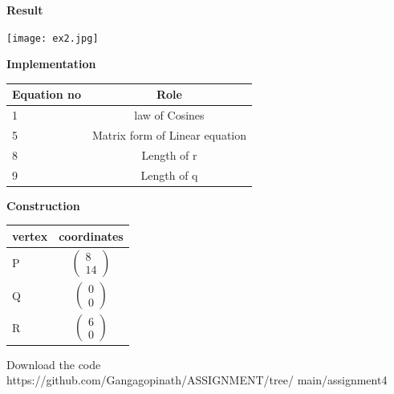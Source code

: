 \documentclass[10pt,a4paper]{article}
\begin{document}
\begin{multicols}{2}
{\textbf{Result} 
\begin{center}
	\texttt{[image: ex2.jpg]}
\end{center}\vspace{5mm}
\newpage
\vspace{4mm}  
\textbf{Implementation}
\begin{center}
\setlength{\arrayrulewidth}{0.5mm}
\setlength{\tabcolsep}{5pt}
\renewcommand{\arraystretch}{3}
    \begin{tabular}{|l|c|}
    \hline 
    \textbf{Equation no} & \textbf{Role} \\ \hline
    1 &  law of Cosines \\ 
    5 & Matrix form of Linear equation  \\
    8 & Length of r\\
    9 & Length of q \\
    
    \hline
      \end{tabular}
  \end{center} \vspace{2mm} 



  \vspace{2mm} \textbf{Construction}
\begin{center}
\setlength{\arrayrulewidth}{0.5mm}
\setlength{\tabcolsep}{6pt}
\renewcommand{\arraystretch}{1.5}
    \begin{tabular}{|l|c|}
  \hline 
  \textbf{vertex} & \textbf{coordinates} \\ \hline
P & $ \begin{pmatrix} 
8 \\
14
\end{pmatrix} $ \\ \hline
   Q & $\begin{pmatrix}
0 \\
0
\end{pmatrix}$   \\\hline
   R & $\begin{pmatrix}
6 \\
0
\end{pmatrix} $\\
   \hline
    \end{tabular}
\end{center}
  
  
 
\raggedright  Download the code \\
https://github.com/Gangagopinath/ASSIGNMENT/tree/
\newline
main/assignment4
}  \end{multicols}
\end{document}
